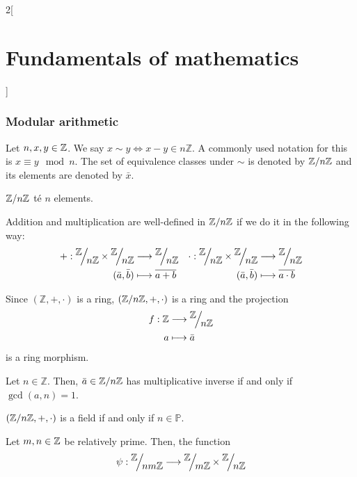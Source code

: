 \documentclass[../../../main.tex]{subfiles}
\begin{document}
\begin{multicols}{2}[\section{Fundamentals of mathematics}]
  \subsubsection{Modular arithmetic}
  \begin{definition}
    Let $n,x,y\in\mathbb{Z}$. We say $x\sim y\iff x-y\in n\mathbb{Z}$. A commonly used notation for this is $x\equiv y\mod n$. The set of equivalence classes under $\sim$ is denoted by $\quot{\mathbb{Z}}{n\mathbb{Z}}$ and its elements are denoted by $\bar{x}$.
  \end{definition}
  \begin{lemma}
    $\quot{\ZZ}{n\ZZ}$ té $n$ elements.
  \end{lemma}
  \begin{prop}
    Addition and multiplication are well-defined in $\quot{\ZZ}{n\ZZ}$ if we do it in the following way:
    \begin{align*}
      +:\quot{\ZZ}{n\ZZ}\times\quot{\ZZ}{n\ZZ} & \longrightarrow\quot{\ZZ}{n\ZZ} & \cdot:\quot{\ZZ}{n\ZZ}\times\quot{\ZZ}{n\ZZ} & \longrightarrow\quot{\ZZ}{n\ZZ} \\
      (\bar{a},\bar{b})                        & \longmapsto\overline{a+b}       & (\bar{a},\bar{b})                            & \longmapsto\overline{a\cdot b}
    \end{align*}
  \end{prop}
  \begin{theorem}
    Since $(\mathbb{Z},+,\cdot)$ is a ring, $(\quot{\ZZ}{n\ZZ},+,\cdot)$ is a ring and the projection
    \begin{align*}
      f:\mathbb{Z} & \longrightarrow\quot{\ZZ}{n\ZZ} \\
      a            & \longmapsto\bar{a}
    \end{align*}
    is a ring morphism.
  \end{theorem}
  \begin{lemma}
    Let $n\in\mathbb{Z}$. Then, $\bar{a}\in\quot{\ZZ}{n\ZZ}$ has multiplicative inverse if and only if $\gcd(a,n)=1$.
  \end{lemma}
  \begin{corollary}
    $(\quot{\ZZ}{n\ZZ},+,\cdot)$ is a field if and only if $n\in\mathbb{P}$.
  \end{corollary}
  \begin{theorem}
    Let $m,n\in\mathbb{Z}$ be relatively prime. Then, the function
    \begin{align*}
      \psi:\quot{\ZZ}{nm\ZZ}               & \longrightarrow\quot{\ZZ}{m\ZZ}\times\quot{\ZZ}{n\ZZ}                                \\

\end{align*}
\end{theorem}
\end{multicols}
\end{document}
